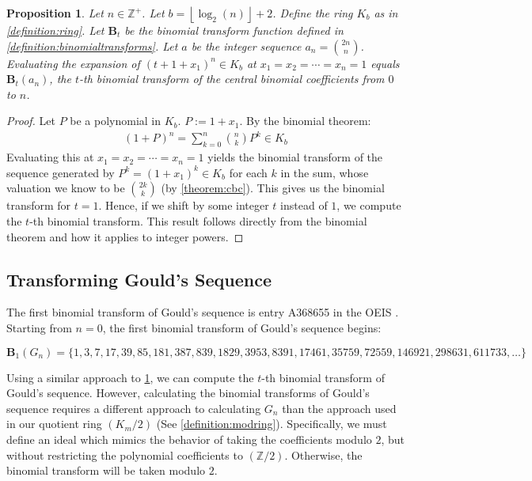 \documentclass{article}
\theoremstyle{plain}
\theoremstyle{definition}
\newtheorem{proposition}{Proposition}
\newcommand{\floor}[1]{\left\lfloor #1 \right\rfloor}
\newcommand{\Z}{\mathbb{Z}}
\newcommand{\K}{K}
\newcommand{\BT}{\textbf{B}}
\begin{document}
\begin{proposition} \label{proposition:binomialtransforms}
\textit{
Let $n \in \Z^+$. Let $b={\floor{\log_2(n)}+2}$. Define the ring $\K_b$ as in \cref{definition:ring}. Let $\BT_t$ be the binomial transform function defined in \cref{definition:binomialtransforms}. Let $a$ be the integer sequence $a_n=\binom{2n}{n}$. Evaluating the expansion of $(t + 1 + x_1)^n \in \K_b$ at $x_1=x_2=\cdots=x_n=1$ equals $\BT_t(a_n)$, the $t$-th binomial transform of the central binomial coefficients from $0$ to $n$.
}
\end{proposition}
\begin{proof}
Let $P$ be a polynomial in $\K_b$. $P := 1 + x_1$. By the binomial theorem:
\begin{align*}
    (1 + P)^n = \sum_{k=0}^{n} \binom{n}{k} P^k \in \K_b
\end{align*}
Evaluating this at $x_1=x_2=\cdots=x_n=1$ yields the binomial transform of the sequence generated by $P^k = (1 + x_1)^k \in \K_b$ for each $k$ in the sum, whose valuation we know to be $\binom{2k}{k}$ (by \cref{theorem:cbc}). This gives us the binomial transform for $t=1$. Hence, if we shift by some integer $t$ instead of $1$, we compute the $t$-th binomial transform. This result follows directly from the binomial theorem and how it applies to integer powers.
\end{proof}

\subsection{Transforming Gould's Sequence}
The first binomial transform of Gould's sequence is entry A368655 in the OEIS \cite{A368655}. Starting from $n=0$, the first binomial transform of Gould's sequence begins:

$\BT_{1}(G_n) = \{ 1, 3, 7, 17, 39, 85, 181, 387, 839, 1829, 3953, 8391, 17461, 35759, 72559, 146921, 298631, 611733, \ldots \}$

Using a similar approach to \cref{proposition:binomialtransforms}, we can compute the $t$-th binomial transform of Gould's sequence. However, calculating the binomial transforms of Gould's sequence requires a different approach to calculating $G_n$ than the approach used in our quotient ring $(K_m/2)$ (See \cref{definition:modring}). Specifically, we must define an ideal which mimics the behavior of taking the coefficients modulo $2$, but without restricting the polynomial coefficients to $(\Z/2)$. Otherwise, the binomial transform will be taken modulo $2$.
\end{document}

